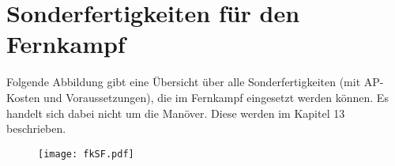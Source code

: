 %


\section{Sonderfertigkeiten für den Fernkampf}
Folgende Abbildung gibt eine Übersicht über alle Sonderfertigkeiten (mit AP-Kosten und Voraussetzungen), die im Fernkampf eingesetzt werden können.
Es handelt sich dabei nicht um die Manöver. Diese werden im Kapitel 13 beschrieben.

\begin{figure}
    \centering
    \texttt{[image: fkSF.pdf]}
\end{figure}

